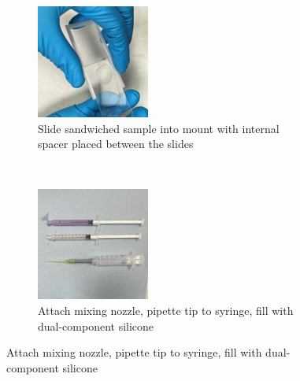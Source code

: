 \clearpage

\begin{figure}[H]
    \addtocounter{figure}{-1}

\begin{subfigure}{.4\linewidth}
\addtocounter{subfigure}{4}
  \includegraphics[width=\linewidth]{Images/Step5.jpg}
  \caption{Slide sandwiched sample into mount with internal spacer placed between the slides}
  \label{velcomp}
\end{subfigure}\hfill 
~
\begin{subfigure}{.4\linewidth}
  \includegraphics[width=\linewidth]{Images/Step6.jpg}
  \caption{Attach mixing nozzle, pipette tip to syringe, fill with dual-component silicone}
  \label{estcomp}
\end{subfigure}\hfill 


\end{figure}
